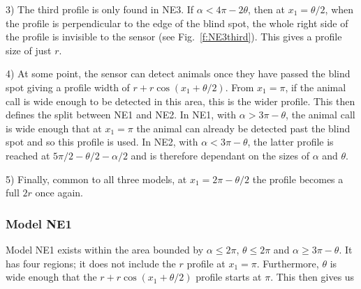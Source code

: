 3) The third profile is only found in NE3. If $\alpha < 4\pi - 2\theta$, then at $x_1=\theta/2$, when the profile is perpendicular to the edge of the blind spot, the whole right side of the profile is invisible to the sensor (see Fig.~\ref{f:NE3third}). This gives a profile size of just $r$.

4) At some point, the sensor can detect animals once they have passed the blind spot giving a profile width of $r + r\cos(x_1 + \theta/2)$. From $x_1=\pi$, if the animal call is wide enough to be detected in this area, this is the wider profile. This then defines the split between NE1 and NE2. In NE1, with $\alpha > 3\pi - \theta$, the animal call is wide enough that at $x_1=\pi$ the animal can already be detected past the blind spot and so this profile is used. In NE2, with $\alpha < 3\pi - \theta$, the latter profile is reached at $5\pi/2 - \theta/2 - \alpha/2$ and is therefore dependant on the sizes of $\alpha$ and $\theta$. 

5) Finally, common to all three models, at $x_1 = 2\pi - \theta/2$ the profile becomes a full $2r$ once again.


\subsubsection{Model NE1} \label{NE1}

Model NE1 exists within the area bounded by $\alpha\le2\pi$, $\theta\le2\pi$ and $\alpha \ge 3\pi - \theta$. It has four regions; it does not include the $r$ profile at $x_1=\pi$. Furthermore, $\theta$ is wide enough that the $r + r\cos(x_1 + \theta/2)$ profile starts at $\pi$. This then gives us





